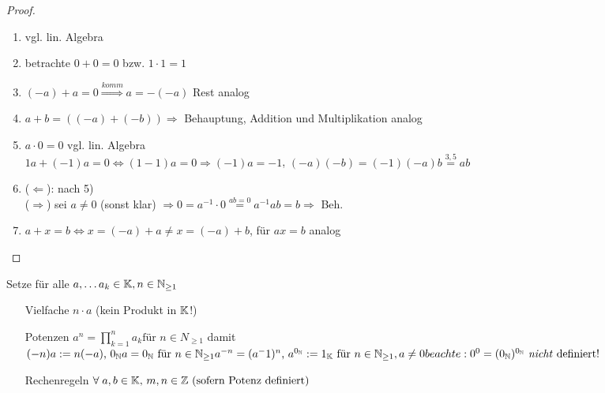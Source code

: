 \begin{proof}
	\begin{enumerate}[label={\arabic*)}]
		\item vgl. lin. Algebra
		\item betrachte $0 + 0 = 0$ bzw. $1 \cdot 1 = 1$
		\item $(-a) + a = 0 \overset{komm}{\Rightarrow} a = -(-a)$ Rest analog
		\item $a+b = ((-a) + (-b)) \Rightarrow$ Behauptung, Addition und Multiplikation analog
		\item $a\cdot 0 = 0$ vgl. lin. Algebra\\
		$1a + (-1)a = 0 \Leftrightarrow (1-1)a=0 \Rightarrow (-1)a=-1$, $(-a)(-b)=(-1)(-a)b\overset{3,5}{=}ab$
		\item ($\Leftarrow$): nach 5)\\
		($\Rightarrow$) sei $a\neq0$ (sonst klar) $\Rightarrow 0 = a^{-1}\cdot 0 \overset{ab=0}{=} a^{-1}ab = b \Rightarrow$ Beh.
		\item $a+x=b \Leftrightarrow x = (-a) + a \neq x = (-a) + b$, für $ax=b$ analog \QEDA
	\end{enumerate}
\end{proof}

Setze für alle $a, \dots a_k \in \mathbb{K},n\in \mathbb{N}_{\geq 1}$
\begin{itemize}
	\item[Vielfache] $n\cdot a$ (kein Produkt in $\mathbb{K}$!)
	\item[Potenzen] $a^n=\prod_{k=1}^{n} a_k \text{für } n \in N_{\geq 1}$ damit $(-n)a:=n(-a) \text{, } 0_{\mathbb{N}}a=0_{\mathbb{N}} \text{ für } n\in\mathbb{N}_{\geq1}\\
	a^{-n}=(a^-1)^n \text{, }a^{0_{\mathbb{N}}}:=1_{\mathbb{K}} \text{ für } n \in \mathbb{N}_{\geq 1}, a \neq 0\\
	beachte: 0^0 = (0_{\mathbb{N}})^{0_{\mathbb{N}}} \text{ \emph{nicht} definiert!}$
	\item[Rechenregeln] $\forall\;a,b\in \mathbb{K}\text{, } m,n\in \mathbb{Z} \text{ (sofern Potenz definiert) } $
\end{itemize}
